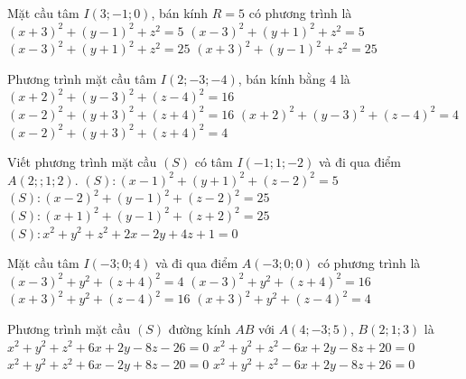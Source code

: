 \begin{ex}%
	Mặt cầu tâm $I(3;-1;0)$, bán kính $R=5$ có phương trình là
	\choice
	{$(x+3)^2+(y-1)^2+z^2=5$}
	{$(x-3)^2+(y+1)^2+z^2=5$}
	{\True $(x-3)^2+(y+1)^2+z^2=25$}
	{$(x+3)^2+(y-1)^2+z^2=25$}
\end{ex}

\begin{ex}%
	Phương trình mặt cầu tâm $I(2; -3; -4)$, bán kính bằng $4$ là
	\choice
	{$(x+2)^2+(y-3)^2+(z-4)^2=16$}
	{\True $(x-2)^2+(y+3)^2+(z+4)^2=16$}
	{$(x+2)^2+(y-3)^2+(z-4)^2=4$}
	{$(x-2)^2+(y+3)^2+(z+4)^2=4$}
	\loigiai
	{
	}
\end{ex}

\begin{ex}%
	Viết phương trình mặt cầu $(S)$ có tâm $I(-1;1;-2)$ và đi qua điểm $A(2;;1;2)$.
	\choice%
	{$(S)\colon (x-1)^2 +(y+1)^2 +(z-2)^2=5$}
	{$(S)\colon (x-2)^2 +(y-1)^2 +(z-2)^2=25$}
	{\True $(S)\colon (x+1)^2 +(y-1)^2 +(z+2)^2=25$}
	{$(S)\colon x^2 +y^2 +z^2 +2x -2y +4z + 1 = 0$}
\end{ex}

\begin{ex}%
	Mặt cầu tâm $I(-3; 0; 4)$ và đi qua điểm $A(-3; 0; 0)$ có phương trình là
	\choice
	{$(x-3)^2+y^2+(z+4)^2=4$}
	{$(x-3)^2+ y^2 + (z+4)^2=16$}
	{\True $(x+3)^2+y^2+(z-4)^2=16$}
	{$(x+3)^2+y^2+(z-4)^2=4$}
\end{ex}

\begin{ex}%
	Phương trình mặt cầu $\left(S\right)$ đường kính $AB$ với $A\left(4; -3; 5\right)$, $B\left(2; 1; 3\right)$ là
	\choice
	{$x^2 + y^2 + z^2 + 6x + 2y - 8z - 26 = 0$}
	{\True $x^2 + y^2 + z^2 - 6x + 2y - 8z + 20 = 0$}
	{$x^2 + y^2 + z^2 + 6x -  2y + 8z - 20 = 0$}
	{$x^2 + y^2 + z^2 - 6x + 2y - 8z +  26 = 0$}
\end{ex}

